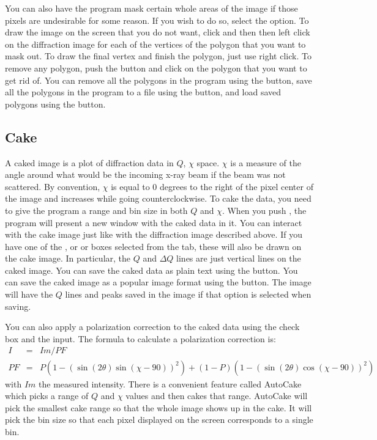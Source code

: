 You can also have the program mask certain whole areas 
of the image if those pixels are undesirable for some 
reason. If you wish to do so, select the 
 option. To draw the image on the
screen that you do not want, click  and
then then left click on the diffraction image for each 
of the vertices of the polygon that you want to mask out.
To draw the final vertex and finish the polygon, just
use right click. To remove any polygon, push the 
 button and click on the polygon that
you want to get rid of. You can remove all the polygons
in the program using the  button, save
all the polygons in the program to a file using the
 button, and load saved polygons using
the  button.

\subsection{Cake}
\index{$\chi$}
A caked image is a plot of diffraction data in $Q$, 
$\chi$ space. $\chi$ is a measure of the angle around 
what would be the incoming x-ray beam if the beam was 
not scattered. By convention, $\chi$ is equal to 0
degrees to the right of the pixel center of the image 
and increases while going counterclockwise. To cake the
data, you need to give the program a range and bin size 
in both $Q$ and $\chi$. When you push , the
program will present a new window with the caked data in
it. You can interact with the cake image just like with
the diffraction image described above. If you have one of
the , or  or 
 boxes selected from the  
tab, these will also be drawn on the cake image. In particular,
the $Q$ and $\Delta Q$ lines are just vertical lines on the
caked image. You can save the caked data as plain text 
using the  button. You can save the caked 
image as a popular image format using the 
button. The image will have the $Q$ lines and peaks saved
in the image if that option is selected when saving.

You can also apply a polarization correction to the caked
data using the  check box
and the  input. The formula to calculate a 
polarization correction is:
\begin{eqnarray}
    I&=&Im/PF \\ 
    PF&=&P(1 - (\sin(2\theta)\sin(\chi-90))^2) + 
    (1 - P)(1 - (\sin(2\theta)\cos(\chi-90))^2)
\end{eqnarray}
with $Im$ the measured intensity. There is a convenient
feature called AutoCake which picks a range of $Q$ and $\chi$ 
values and then cakes that range. AutoCake will pick the
smallest cake range so that the whole image shows up in
the cake. It will pick the bin size so that each pixel 
displayed on the screen corresponds to a single bin.

